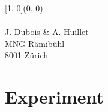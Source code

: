 \documentclass[12pt, a4paper, twoside]{article}
\begin{document}
    \begin{textblock}{\pgfmathresult}[1, 0](0, 0)
    \noindent
    \\\\ J. Dubois \& A. Huillet\\ MNG Rämibühl\\ 8001 Zürich
    \end{textblock}
    

    \newpage
    
    \section{Experiment}
    \newpage
\end{document}
